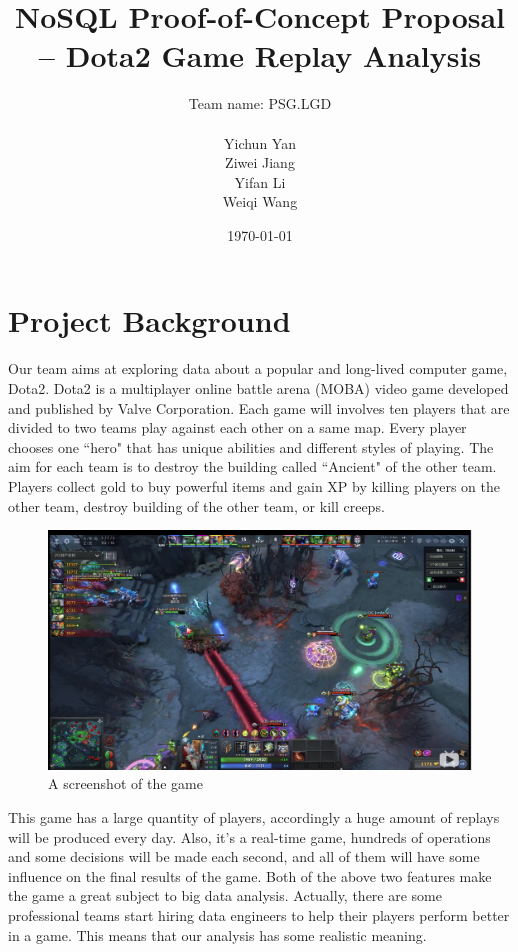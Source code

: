 \documentclass{article}
\title{NoSQL Proof-of-Concept Proposal -- Dota2 Game Replay Analysis}
\author{
	Team name: PSG.LGD \\ \\
	Yichun Yan \\
	Ziwei Jiang \\
	Yifan Li \\
	Weiqi Wang
}
\date{\today}
\begin{document}
\maketitle

\tableofcontents
\clearpage


\section{Project Background}

Our team aims at exploring data about a popular and long-lived computer game, Dota2. Dota2 is a multiplayer online battle arena (\gls{MOBA}) video game developed and published by Valve Corporation. Each game will involves ten players that are divided to two teams play against each other on a same map. Every player chooses one ``hero" that has unique abilities and different styles of playing. The aim for each team is to destroy the building called ``\gls{Ancient}" of the other team. Players collect \gls{gold} to buy powerful items and gain \gls{XP} by killing players on the other team, destroy building of the other team, or kill \gls{creeps}.

\begin{figure}[H]
	\centering
	\includegraphics[width=\linewidth]{pic/combat.png}
	\caption{A screenshot of the game}
\end{figure}
This game has a large quantity of players, accordingly a huge amount of replays will be produced every day. Also, it's a real-time game, hundreds of operations and some decisions will be made each second, and all of them will have some influence on the final results of the game. Both of the above two features make the game a great subject to big data analysis. Actually, there are some professional teams start hiring data engineers to help their players perform better in a game. This means that our analysis has some realistic meaning.
\end{document}
